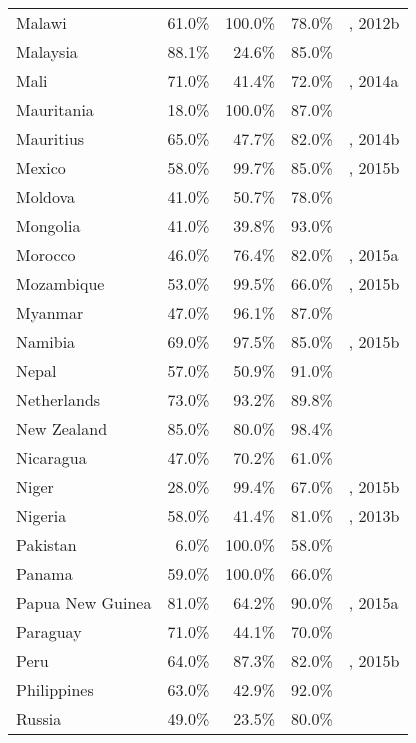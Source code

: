\begin{longtable}{lrrrl}
  Malawi & 61.0\% & 100.0\% & 78.0\% & \cite{Unaids2016-an}, 2012b \\
  Malaysia & 88.1\% & 24.6\% & 85.0\% & \cite{Unaids2016-an, AIDSdatahub-fg} \\
  Mali & 71.0\% & 41.4\% & 72.0\% & \cite{Unaids2016-an}, 2014a \\
  Mauritania & 18.0\% & 100.0\% & 87.0\% & \cite{Unaids2016-an} \\
  Mauritius & 65.0\% & 47.7\% & 82.0\% & \cite{Unaids2016-an}, 2014b \\
  Mexico & 58.0\% & 99.7\% & 85.0\% & \cite{Unaids2016-an}, 2015b \\
  Moldova & 41.0\% & 50.7\% & 78.0\% & \cite{Unaids2016-an} \\
  Mongolia & 41.0\% & 39.8\% & 93.0\% & \cite{Unaids2016-an, Unaids2016-am} \\
  Morocco & 46.0\% & 76.4\% & 82.0\% & \cite{Unaids2016-an}, 2015a \\
  Mozambique & 53.0\% & 99.5\% & 66.0\% & \cite{Unaids2016-an}, 2015b \\
  Myanmar & 47.0\% & 96.1\% & 87.0\% & \cite{Unaids2016-an} \\
  Namibia & 69.0\% & 97.5\% & 85.0\% & \cite{Unaids2016-an}, 2015b \\
  Nepal & 57.0\% & 50.9\% & 91.0\% & \cite{Unaids2016-an} \\
  Netherlands & 73.0\% & 93.2\% & 89.8\% & \cite{aid2014} \\
  New Zealand & 85.0\% & 80.0\% & 98.4\% & \cite{Unaids2016-am} \\
  Nicaragua & 47.0\% & 70.2\% & 61.0\% & \cite{Unaids2016-an} \\
  Niger & 28.0\% & 99.4\% & 67.0\% & \cite{Unaids2016-an}, 2015b \\
  Nigeria & 58.0\% & 41.4\% & 81.0\% & \cite{Unaids2016-an}, 2013b \\
  Pakistan & 6.0\% & 100.0\% & 58.0\% & \cite{Unaids2016-an} \\
  Panama & 59.0\% & 100.0\% & 66.0\% & \cite{Unaids2016-an} \\
  Papua New Guinea & 81.0\% & 64.2\% & 90.0\% & \cite{Unaids2016-an}, 2015a \\
  Paraguay & 71.0\% & 44.1\% & 70.0\% & \cite{Unaids2016-an} \\
  Peru & 64.0\% & 87.3\% & 82.0\% & \cite{Unaids2016-an}, 2015b \\
  Philippines & 63.0\% & 42.9\% & 92.0\% & \cite{Unaids2016-an} \\
  Russia & 49.0\% & 23.5\% & 80.0\% & \cite{pokrovskaya2014cascade} \\

\end{longtable}
